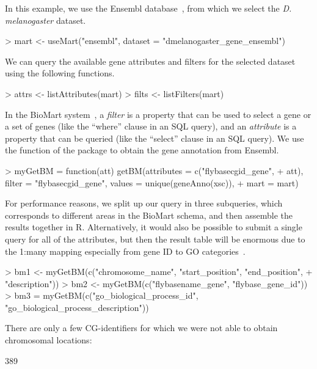 %
In this example, we use the Ensembl database~\cite{Ensembl2006}, from
which we select the \textit{D. melanogaster} dataset.
%
\begin{Schunk}
\begin{Sinput}
> mart <- useMart("ensembl", dataset = "dmelanogaster_gene_ensembl")
\end{Sinput}
\end{Schunk}
% 
We can query the available gene attributes and filters for the
selected dataset using the following functions.
\begin{Schunk}
\begin{Sinput}
> attrs <- listAttributes(mart)
> filts <- listFilters(mart)
\end{Sinput}
\end{Schunk}
%
In the BioMart system~\cite{Kasprzyk2004}, a \emph{filter} is a
property that can be used to select a gene or a set of genes (like the
``where'' clause in an SQL query), and an \emph{attribute} is a
property that can be queried (like the ``select'' clause in an SQL
query). We use the  function of the package
 to obtain the gene annotation from Ensembl.
%
\begin{Schunk}
\begin{Sinput}
> myGetBM = function(att) getBM(attributes = c("flybasecgid_gene", 
+     att), filter = "flybasecgid_gene", values = unique(geneAnno(xsc)), 
+     mart = mart)
\end{Sinput}
\end{Schunk}
% 
For performance reasons, we split up our query in three subqueries,
which corresponds to different areas in the BioMart schema, and then
assemble the results together in R.  Alternatively, it would also be
possible to submit a single query for all of the attributes, but then
the result table will be enormous due to the 1:many mapping
especially from gene ID to GO categories~\cite{GO}.
%
\begin{Schunk}
\begin{Sinput}
> bm1 <- myGetBM(c("chromosome_name", "start_position", "end_position", 
+     "description"))
> bm2 <- myGetBM(c("flybasename_gene", "flybase_gene_id"))
> bm3 = myGetBM(c("go_biological_process_id", "go_biological_process_description"))
\end{Sinput}
\end{Schunk}
%
There are only a few CG-identifiers for which we were not able to
obtain chromosomal locations: 
%
\begin{Schunk}
\begin{Soutput}
[1] 389
\end{Soutput}
\end{Schunk}
